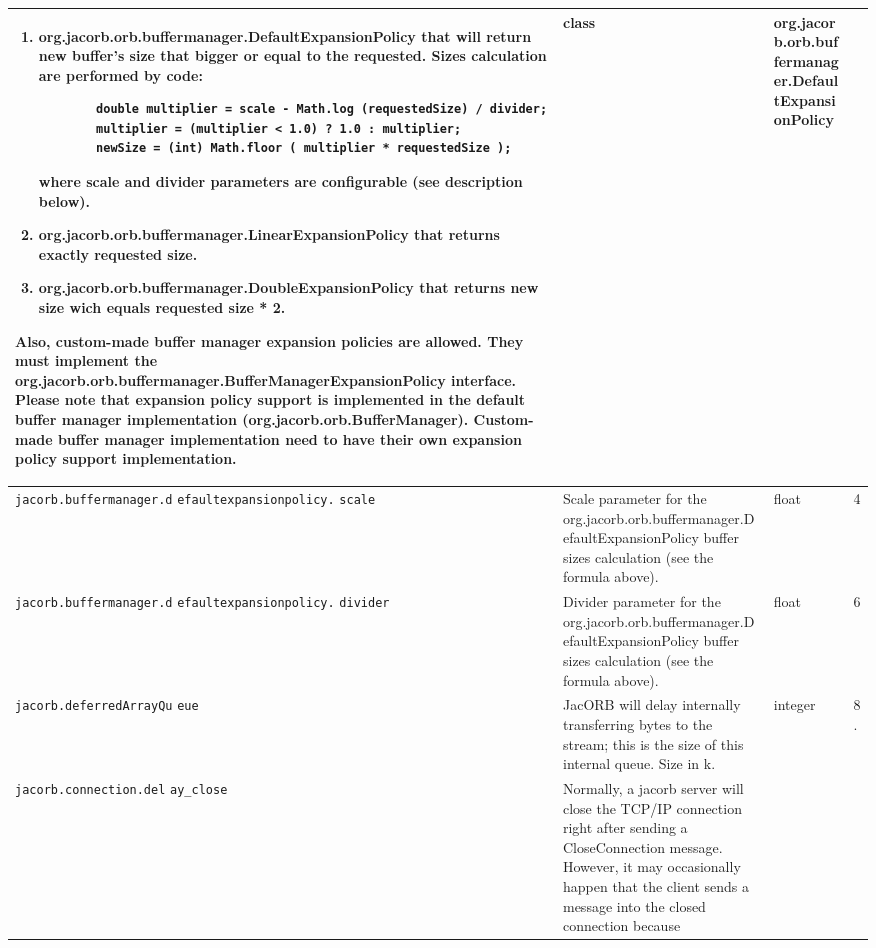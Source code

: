 {{\begin{small}
\begin{longtable}{|p{5cm}|p{7.5cm}|p{1.5cm}|p{1.5cm}|}
\begin{enumerate}
\item org.jacorb.orb.buffermanager.DefaultExpansionPolicy that will
    return new buffer's size that bigger or equal to the requested.
    Sizes calculation are performed by code:
\begin{small}
\begin{verbatim}
        double multiplier = scale - Math.log (requestedSize) / divider;
        multiplier = (multiplier < 1.0) ? 1.0 : multiplier;
        newSize = (int) Math.floor ( multiplier * requestedSize );
\end{verbatim}
\end{small}
     where scale and divider parameters are configurable (see description
     below).
\item org.jacorb.orb.buffermanager.LinearExpansionPolicy that returns exactly
     requested size.
\item org.jacorb.orb.buffermanager.DoubleExpansionPolicy that returns new
     size wich equals requested size * 2.
\end{enumerate}
Also, custom-made buffer manager expansion policies are allowed. They must
implement the org.jacorb.orb.buffermanager.BufferManagerExpansionPolicy
interface. Please note that expansion policy support is implemented in the
default buffer manager implementation (org.jacorb.orb.BufferManager).
Custom-made buffer manager implementation need to have their own expansion
policy support implementation.
& class & org.jacorb.orb.buffermanager.DefaultExpansionPolicy \\
\hline
\verb"jacorb.buffermanager.d"
\verb"efaultexpansionpolicy."
\verb"scale" & Scale parameter for the org.jacorb.orb.buffermanager.DefaultExpansionPolicy
buffer sizes calculation (see the formula above).
 & float & 4 \\
\hline
\verb"jacorb.buffermanager.d"
\verb"efaultexpansionpolicy."
\verb"divider" & Divider parameter for the org.jacorb.orb.buffermanager.DefaultExpansionPolicy
buffer sizes calculation (see the formula above).
 & float & 6 \\
\hline
\verb"jacorb.deferredArrayQu"
\verb"eue" & JacORB will delay internally transferring bytes to the stream;
this is the size of this internal queue. Size in k. & integer & 8. \\
\hline
\verb"jacorb.connection.del"
\verb"ay_close" & Normally, a jacorb server will close the TCP/IP connection
right after sending a CloseConnection message. However, it may occasionally
happen that the client sends a message into the closed connection because

\end{longtable}
\end{small}}}
